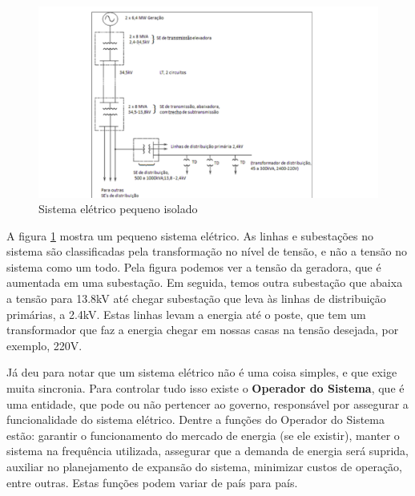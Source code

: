 \begin{figure}[h]
\begin{centering}
\includegraphics[scale=0.5]{anexos/figrede}
\par\end{centering}

\caption{\label{fig:rede}Sistema elétrico pequeno isolado}
\end{figure}

A figura \ref{fig:rede} mostra um pequeno sistema elétrico. As linhas e subestações no sistema são classificadas pela transformação no nível de tensão, e não a tensão no sistema como um todo. Pela figura podemos ver a tensão da geradora, que é aumentada em uma subestação. Em seguida, temos outra subestação que abaixa a tensão para 13.8kV até chegar subestação que leva às linhas de distribuição primárias, a 2.4kV. Estas linhas levam a energia até o poste, que tem um transformador que faz a energia chegar em nossas casas na tensão desejada, por exemplo, 220V. 

Já deu para notar que um sistema elétrico não é uma coisa simples, e que exige muita sincronia. Para controlar tudo isso existe o \textbf{Operador do Sistema}, que é uma entidade, que pode ou não pertencer ao governo, responsável por assegurar a funcionalidade do sistema elétrico. Dentre a funções do Operador do Sistema estão: garantir o funcionamento do mercado de energia (se ele existir), manter o sistema na frequência utilizada, assegurar que a demanda de energia será suprida, auxiliar no planejamento de expansão do sistema, minimizar custos de operação, entre outras. Estas funções podem variar de país para país.

